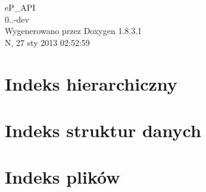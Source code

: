 \documentclass{article}
\begin{document}
\hypersetup{pageanchor=false,citecolor=blue}
\begin{titlepage}
\vspace*{7cm}
\begin{center}
{\Large e\-P\-\_\-\-A\-P\-I \\[1ex]\large 0..-\/dev }\\
\vspace*{1cm}
{\large Wygenerowano przez Doxygen 1.8.3.1}\\
\vspace*{0.5cm}
{\small N, 27 sty 2013 02:52:59}\\
\end{center}
\end{titlepage}
\tableofcontents
{}
\hypersetup{pageanchor=true,citecolor=blue}
\section{Indeks hierarchiczny}

\section{Indeks struktur danych}

\section{Indeks plików}

\end{document}
